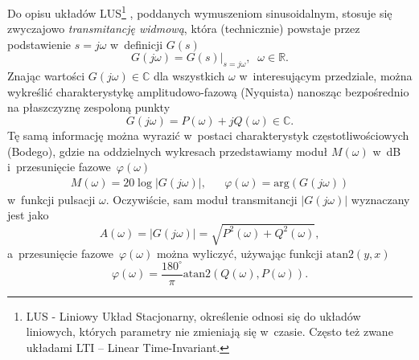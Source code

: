 \documentclass[paper=a4,DIV=12]{lpas}
\newcommand{\degree}{^{\circ}}
\begin{document}
\begin{appendices}
  Do opisu układów LUS\footnote{LUS - Liniowy Układ Stacjonarny, określenie
  odnosi się do układów liniowych, których parametry nie zmieniają się
  w~czasie. Często też zwane układami LTI -- Linear Time-Invariant.} ,
  poddanych wymuszeniom sinusoidalnym, stosuje się zwyczajowo {\em transmitancję
  widmową}, która (technicznie) powstaje przez podstawienie $s = j\omega$
  w~definicji $G(s)$
  \begin{equation}
    G\left(j \omega\right) = G\left(s\right)|_{s = j \omega},
    \;\; \omega \in \mathbb{R}.
    \label{eq:WEMIV}
  \end{equation}
  Znając wartości $G(j\omega) \in \mathbb{C}$ dla wszystkich $\omega$
  w~interesującym przedziale, można wykreślić charakterystykę amplitudowo-fazową
  (Nyquista) nanosząc bezpośrednio na płaszczyznę zespoloną punkty
  \begin{equation}
    G(j\omega) = P(\omega) +j Q(\omega) \in \mathbb{C}.
    \label{eq:Z6A8G}
  \end{equation}
  Tę samą informację można wyrazić w~postaci charakterystyk częstotliwościowych
  (Bodego), gdzie na oddzielnych wykresach przedstawiamy moduł $M(\omega)$ w~dB
  i~przesunięcie fazowe~$\varphi(\omega)$
  \begin{equation}
    \begin{aligned}
      &
      M(\omega) = 20 \log \left|G(j\omega)\right|,
      &&
      \varphi(\omega) = \text{arg}{\left(G(j\omega)\right)}
      &
    \end{aligned}
    \label{eq:YT6UA}
  \end{equation}
  w~funkcji pulsacji $\omega$. Oczywiście, sam moduł transmitancji $|G(j\omega)|$
  wyznaczany jest jako
  \begin{equation}
    A(\omega) = |G(j\omega)| = \sqrt{P^2(\omega) + Q^2(\omega)},
    \label{eq:S278F}
  \end{equation}
  a~przesunięcie fazowe~$\varphi(\omega)$ można wyliczyć, używając funkcji
  $\text{atan2}(y,x)$
  \begin{equation}
    \varphi(\omega) = \frac{180\degree}{\pi}\text{atan2}(Q(\omega), P(\omega)).
    \label{eq:XDQ8Q}
  \end{equation}


\end{appendices}
\end{document}
